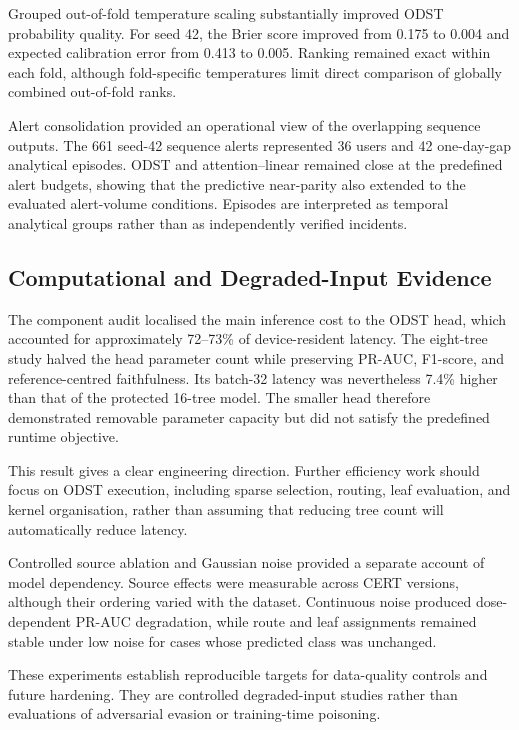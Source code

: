 \smallskip
Grouped out-of-fold temperature scaling substantially improved ODST
probability quality. For seed 42, the Brier score improved from 0.175 to
0.004 and expected calibration error from 0.413 to 0.005. Ranking remained
exact within each fold, although fold-specific temperatures limit direct
comparison of globally combined out-of-fold ranks.

\smallskip
Alert consolidation provided an operational view of the overlapping
sequence outputs. The 661 seed-42 sequence alerts represented 36 users and
42 one-day-gap analytical episodes. ODST and attention--linear remained
close at the predefined alert budgets, showing that the predictive
near-parity also extended to the evaluated alert-volume conditions.
Episodes are interpreted as temporal analytical groups rather than as
independently verified incidents.

\subsection{Computational and Degraded-Input Evidence}
\label{subsec:discussion_efficiency}
The component audit localised the main inference cost to the ODST head,
which accounted for approximately 72--73\% of device-resident latency. The
eight-tree study halved the head parameter count while preserving PR-AUC,
F1-score, and reference-centred faithfulness. Its batch-32 latency was
nevertheless 7.4\% higher than that of the protected 16-tree model. The
smaller head therefore demonstrated removable parameter capacity but did
not satisfy the predefined runtime objective.

\smallskip
This result gives a clear engineering direction. Further efficiency work
should focus on ODST execution, including sparse selection, routing, leaf
evaluation, and kernel organisation, rather than assuming that reducing
tree count will automatically reduce latency.

\smallskip
Controlled source ablation and Gaussian noise provided a separate account
of model dependency. Source effects were measurable across CERT versions,
although their ordering varied with the dataset. Continuous noise produced
dose-dependent PR-AUC degradation, while route and leaf assignments remained
stable under low noise for cases whose predicted class was unchanged.

\smallskip
These experiments establish reproducible targets for data-quality controls
and future hardening. They are controlled degraded-input studies rather
than evaluations of adversarial evasion or training-time poisoning.

